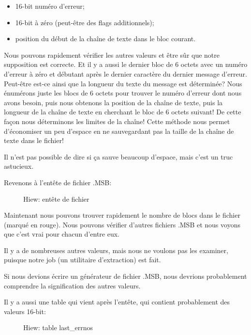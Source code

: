 \begin{itemize}
\item 16-bit numéro d'erreur;
\item 16-bit à zéro (peut-être des flags additionnels);
\item position du début de la chaîne de texte dans le bloc courant.
\end{itemize}

Nous pouvons rapidement vérifier les autres valeurs et être sûr que notre supposition
est correcte.
Et il y a aussi le dernier bloc  de 6 octets avec un numéro d'erreur à
zéro et débutant après le dernier caractère du dernier message d'erreur.
Peut-être est-ce ainsi que la longueur du texte du message est déterminée?
Nous énumérons juste les blocs de 6 octets pour trouver le numéro d'erreur
dont nous avons besoin, puis nous obtenons la position de la chaîne de texte, puis
la longueur de la chaîne de texte en cherchant le bloc de 6 octets suivant!
De cette façon nous déterminons les limites de la chaîne!
Cette méthode nous permet d'économiser un peu d'espace en ne sauvegardant pas
la taille de la chaîne de texte dans le fichier!

Il n'est pas possible de dire si ça sauve beaucoup d'espace, mais c'est un truc
astucieux.

\clearpage
Revenons à l'entête de fichier .MSB:

\begin{figure}[H]
\centering
{}
\caption{Hiew: entête de fichier}
\label{fig:oracle_MSB_3}
\end{figure}

Maintenant nous pouvons trouver rapidement le nombre de blocs dans le fichier
(marqué en rouge).
Nous pouvons vérifier d'autres fichiers .MSB et nous voyons que c'est vrai pour
chacun d'entre eux.

Il y a de nombreuses autres valeurs, mais nous ne voulons pas les examiner,
puisque notre job (un utilitaire d'extraction) est fait.

Si nous devions écrire un générateur de fichier .MSB, nous devrions probablement
comprendre la signification des autres valeurs.

\clearpage
Il y a aussi une table qui vient après l'entête, qui contient probablement des
valeurs 16-bit:

\begin{figure}[H]
\centering
{}
\caption{Hiew: table last\_errnos}
\label{fig:oracle_MSB_4}
\end{figure}

